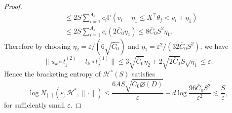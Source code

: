 {\begin{proof}
\begin{align*}
&\le 2S\sum_{i =1}^{A_d} c_i{\mathbb{P}(v_i -\eta_1 \le X^{\top}\theta_j < v_i + \eta_1)}\\
&\le 2S\sum_{i =1}^{A_d} c_i(2\overline{C}_0\eta_1)\le8\overline{C}_0S^2\eta_1.
\end{align*}
Therefore by choosing $\eta_2 = \varepsilon/(6\sqrt{\overline{C}_0})$ and $\eta_1 = \varepsilon^2/(32\overline{C}_0S^2)$, we have
\[
\|u_k\circ t_j^{(2)} - l_k\circ t_j^{(1)}\| \le 3\sqrt{\overline{C}_0}\eta_2 + 2\sqrt{2\overline{C}_0}S\sqrt{\eta_1} \le \varepsilon.
\]
Hence the bracketing entropy of $\mathcal{H}^*(S)$ satisfies
\[
\log N_{[\;]}(\varepsilon, \mathcal{H}^*, \|\cdot\|) \le \frac{6AS \sqrt{\overline{C}_0 \diameter(D)}}{\varepsilon} - d\log \frac{96\overline{C}_0S^2}{\varepsilon^2} \lesssim \frac{S}{\varepsilon} ,
\]
for sufficiently small $\varepsilon$. \qedhere

\end{proof}

}
